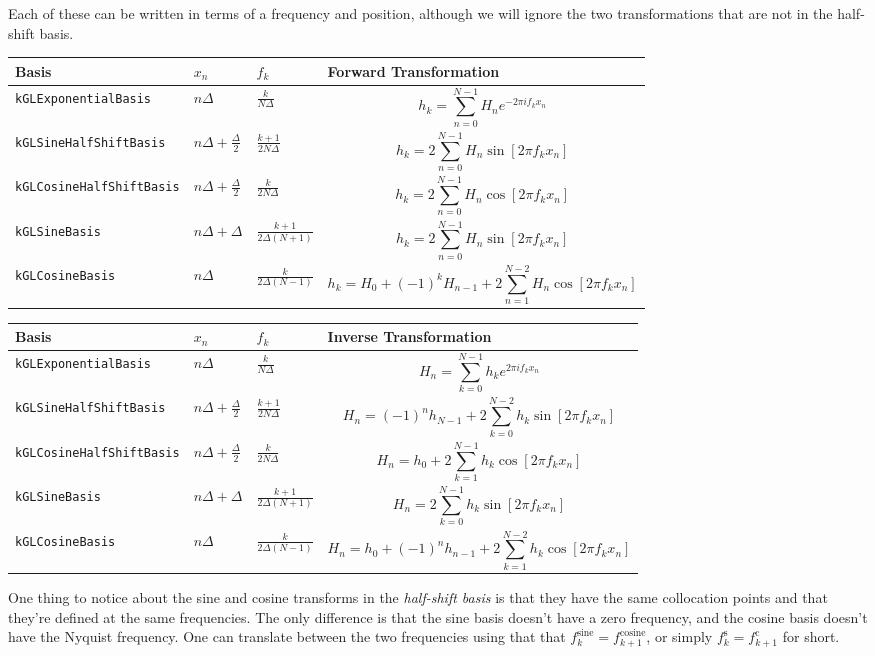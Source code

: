 \documentclass[11pt]{article}
\begin{document}
Each of these can be written in terms of a frequency and position, although we will ignore the two transformations that are not in the half-shift basis.

\begin{tabular}{lllL}
      \hline
      Basis &$x_n$ & $f_k$ & Forward Transformation \tabularnewline \hline \hline
      \verb"kGLExponentialBasis" & $n\Delta$ & $\frac{k}{N\Delta}$ & \[ h_k = \sum_{n=0}^{N-1} H_n e^{-2\pi i f_k x_n} \] \tabularnewline
      \verb"kGLSineHalfShiftBasis" & $ n\Delta + \frac{\Delta}{2}$ & $\frac{k+1}{2N\Delta}$ & \[ h_k = 2 \sum_{n=0}^{N-1} H_n \sin \left[ 2 \pi f_k x_n \right] \] \tabularnewline
      \verb"kGLCosineHalfShiftBasis" & $ n\Delta + \frac{\Delta}{2}$ & $\frac{k}{2N\Delta}$ & \[ h_k = 2 \sum_{n=0}^{N-1} H_n \cos \left[ 2 \pi f_k x_n \right] \] \tabularnewline
       \verb"kGLSineBasis" & $n\Delta + \Delta$ & $\frac{k+1}{2 \Delta (N+1)}$ & \[ h_k = 2 \sum_{n=0}^{N-1} H_n \sin \left[ 2 \pi f_k x_n \right] \] \tabularnewline
      \verb"kGLCosineBasis"&$n\Delta$ & $\frac{k}{2 \Delta (N-1)}$ & \[ h_k = H_{0} + (-1)^{k} H_{n-1} +  2 \sum_{n=1}^{N-2} H_n \cos \left[ 2 \pi f_k x_n \right] \] \tabularnewline 
      \hline
\end{tabular}

\begin{tabular}{lllL}
      \hline
      Basis &$x_n$ & $f_k$ & Inverse Transformation \tabularnewline \hline \hline
      \verb"kGLExponentialBasis" & $n\Delta$ & $\frac{k}{N\Delta}$ & \[ H_n = \sum_{k=0}^{N-1} h_k e^{2\pi i f_k x_n} \] \tabularnewline
      \verb"kGLSineHalfShiftBasis" & $ n\Delta + \frac{\Delta}{2}$ & $\frac{k+1}{2N\Delta}$ & \[ H_n = (-1)^n h_{N-1} + 2 \sum_{k=0}^{N-2} h_k \sin \left[ 2 \pi f_k x_n \right] \] \tabularnewline
      \verb"kGLCosineHalfShiftBasis" & $ n\Delta + \frac{\Delta}{2}$ & $\frac{k}{2N\Delta}$ & \[ H_n = h_{0} + 2 \sum_{k=1}^{N-1} h_k \cos \left[ 2 \pi f_k x_n \right] \] \tabularnewline
      \verb"kGLSineBasis" & $n\Delta + \Delta$ & $\frac{k+1}{2 \Delta (N+1)}$ & \[ H_n = 2 \sum_{k=0}^{N-1} h_k \sin \left[ 2 \pi f_k x_n \right] \] \tabularnewline
      \verb"kGLCosineBasis"&$n\Delta$ & $\frac{k}{2 \Delta (N-1)}$ & \[ H_n = h_{0} + (-1)^{n} h_{n-1} +  2 \sum_{k=1}^{N-2} h_k \cos \left[ 2 \pi f_k x_n \right] \] \tabularnewline 
      \hline
\end{tabular}

One thing to notice about the sine and cosine transforms in the \emph{half-shift basis} is that they have the same collocation points and that they're defined at the same frequencies. The only difference is that the sine basis doesn't have a zero frequency, and the cosine basis doesn't have the Nyquist frequency. One can translate between the two frequencies using that that $f_k^{\textrm{sine}}=f_{k+1}^{\textrm{cosine}}$, or simply $f_k^{\textrm{s}}=f_{k+1}^{\textrm{c}}$ for short.
\end{document}
